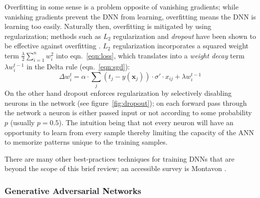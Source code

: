 Overfitting in some sense is a problem opposite of vanishing gradients; while vanishing gradients prevent the DNN from learning, overfitting means the DNN is learning too easily.
%
Naturally then, overfitting is mitigated by using regularization; methods such as \(L_2\) regularization and \textit{dropout} have been shown to be effective against overfitting \cite{bengio2013}.
%
\(L_2\) regularization incorporates a squared weight term \(\frac{\lambda}{2}\sum_{i=1}^n w_i^2\) into eqn.~\eqref{eqn:loss}, which translates into a \textit{weight decay} term \(\lambda w_i^{t-1}\) in the Delta rule (eqn.~\eqref{eqn:sgd}):
\begin{equation}
    \Delta w_i^t = \alpha \cdot \sum_j (t_j-y(\mathbf{x}_j))\cdot \sigma'\cdot x_{ij} + \lambda w_i^{t-1}
    \label{eqn:weightdecaydelta}
\end{equation}
On the other hand dropout enforces regularization by selectively disabling neurons in the network (see figure~\ref{fig:dropout}); on each forward pass through the network a neuron is either passed input or not according to some probability \(p\) (usually \(p = 0.5\)).
%
The intuition being that not every neuron will have an opportunity to learn from every sample thereby limiting the capacity of the ANN to memorize patterns unique to the training samples.

There are many other best-practices techniques for training DNNs that are beyond the scope of this brief review; an accessible survey is Montavon \etal \cite{montavon2012neural}.




\subsubsection{Generative Adversarial Networks}\label{subsubsec:gan}




